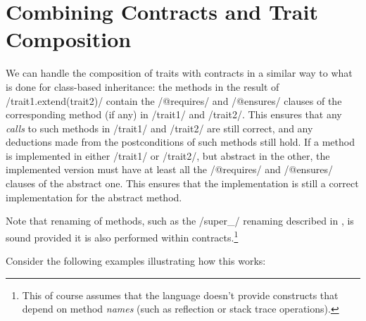 \section{Combining Contracts and Trait Composition}\label{s:combining}
We can handle the composition of traits with contracts in a similar way to what is done for class-based inheritance: the methods in the result of /trait1.extend(trait2)/ contain the /@requires/ and /@ensures/ clauses of the corresponding method (if any) in /trait1/ and /trait2/. This ensures that any \emph{calls} to such methods in /trait1/ and /trait2/ are still correct, and any deductions made from the postconditions of such methods still hold. If a method is implemented in either /trait1/ or /trait2/, but abstract in the other, the implemented version must have at least all the /@requires/ and /@ensures/ clauses of the abstract one. This ensures that the implementation is still a correct implementation for the abstract method.

Note that renaming of methods, such as the /super_/ renaming described in , is sound provided it is also performed within contracts.\footnote{This of course assumes that the language doesn't provide constructs that depend on method \emph{names} (such as reflection or stack trace operations).}

Consider the following examples illustrating how this works:

